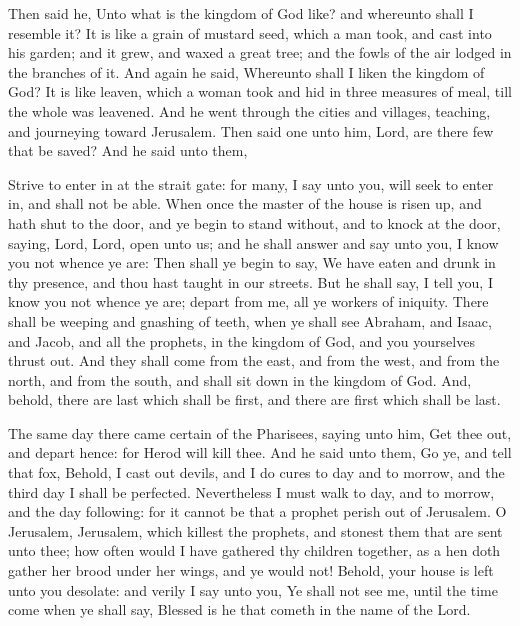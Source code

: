  Then said he, Unto what is the kingdom of God like? and
whereunto shall I resemble it?  It is like a grain of
mustard seed, which a man took, and cast into his garden; and it grew,
and waxed a great tree; and the fowls of the air lodged in the branches
of it.  And again he said, Whereunto shall I liken the
kingdom of God?  It is like leaven, which a woman took and
hid in three measures of meal, till the whole was leavened.
 And he went through the cities and villages, teaching, and
journeying toward Jerusalem.  Then said one unto him, Lord,
are there few that be saved? And he said unto them,

 Strive to enter in at the strait gate: for many, I say
unto you, will seek to enter in, and shall not be able. 
When once the master of the house is risen up, and hath shut to the
door, and ye begin to stand without, and to knock at the door, saying,
Lord, Lord, open unto us; and he shall answer and say unto you, I know
you not whence ye are:  Then shall ye begin to say, We have
eaten and drunk in thy presence, and thou hast taught in our streets.
 But he shall say, I tell you, I know you not whence ye
are; depart from me, all ye workers of iniquity.  There
shall be weeping and gnashing of teeth, when ye shall see Abraham, and
Isaac, and Jacob, and all the prophets, in the kingdom of God, and you
yourselves thrust out.  And they shall come from the east,
and from the west, and from the north, and from the south, and shall sit
down in the kingdom of God.  And, behold, there are last
which shall be first, and there are first which shall be last.

 The same day there came certain of the Pharisees, saying
unto him, Get thee out, and depart hence: for Herod will kill thee.
 And he said unto them, Go ye, and tell that fox, Behold, I
cast out devils, and I do cures to day and to morrow, and the third day
I shall be perfected.  Nevertheless I must walk to day, and
to morrow, and the day following: for it cannot be that a prophet perish
out of Jerusalem.  O Jerusalem, Jerusalem, which killest
the prophets, and stonest them that are sent unto thee; how often would
I have gathered thy children together, as a hen doth gather her brood
under her wings, and ye would not!  Behold, your house is
left unto you desolate: and verily I say unto you, Ye shall not see me,
until the time come when ye shall say, Blessed is he that cometh in the
name of the Lord.

